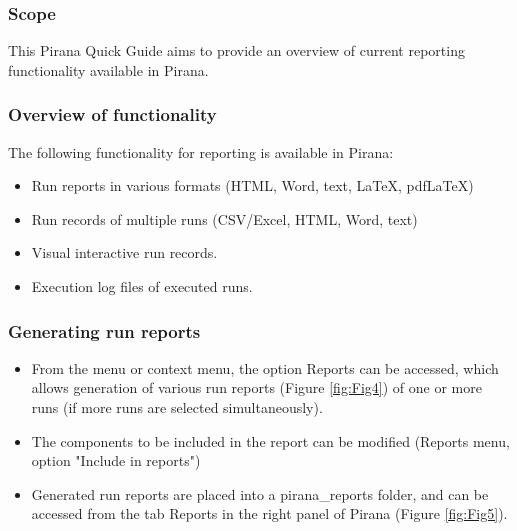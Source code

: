 
\begin{center}
   {\colorbox{grey2}{
         \begin{minipage}[t]{0.9\textwidth}
\subsubsection*{Scope}
This Pirana Quick Guide aims to provide an overview of current reporting functionality
available in Pirana.
          \end{minipage}
      }
   }
\end{center}


\subsubsection*{Overview of functionality}
The following functionality for reporting is available in Pirana:
\begin{itemize}
\item Run reports in various formats (HTML, Word, text, LaTeX, 
 pdfLaTeX)
\item Run records of multiple runs (CSV/Excel, HTML, Word, text)
\item Visual interactive run records.
\item Execution log files of executed runs.
\end{itemize}



\subsubsection*{Generating run reports}
\begin{itemize}
\item From the menu or context menu, the option Reports can be accessed, which allows generation of various run reports (Figure \ref{fig:Fig4}) of one or more runs (if more runs are selected simultaneously).
\item The components to be included in the report can be modified (Reports menu, option "Include in reports")
\item Generated run reports are placed into a pirana\_reports folder, and can be accessed from the tab Reports in the right panel of Pirana (Figure \ref{fig:Fig5}). 
\end{itemize}

